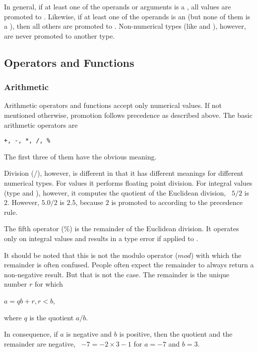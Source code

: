 In general, if at least one of the
operands or arguments is a ,
all values are promoted to .
Likewise, if at least one of the operands
is an  (but none of them is a ),
then all others are promoted to .
Non-numerical types (like  and ),
however, are never promoted to another type.

\subsection{Operators and Functions}
\subsubsection{Arithmetic}
Arithmetic operators and functions
accept only numerical values.
If not mentioned otherwise,
promotion follows precedence as described above.
The basic arithmetic operators are
\begin{verbatim}
+, -, *, /, %
\end{verbatim}
The first three of them have the obvious meaning.

Division (/), however, is different in that it
has different meanings for different numerical types.
For  values it performs floating point
division. For integral values (type  and
), however, it computes the quotient
of the Euclidean division, \eg\ $5/2$ is $2$.
However, $5.0/2$ is $2.5$, because $2$ is promoted
to  according to the precedence rule.

The fifth operator (\%) is the remainder of
the Euclidean division.
It operates only on integral values and results
in a type error if applied to .

It should be noted that this is not the modulo
operator ($mod$) with which the remainder is
often confused. People often expect the 
remainder to always return a non-negative result.
But that is not the case. The remainder is the
unique number $r$ for which

$a = qb + r, r < b$,

where $q$ is the quotient $a/b$.

In consequence, if $a$ is negative and $b$
is positive, then the quotient and the 
remainder are negative, \eg\
$-7 = -2\times 3 -1$ for $a=-7$ and $b=3$.

